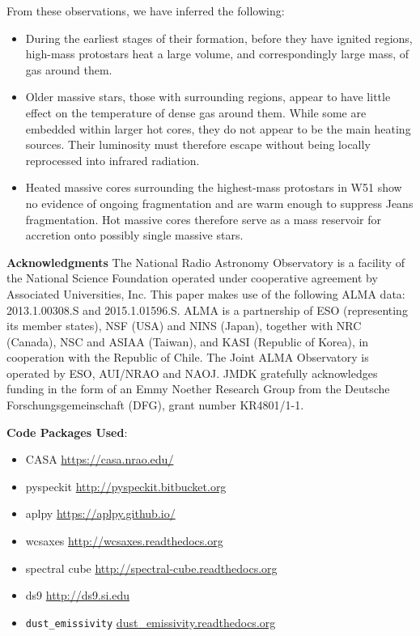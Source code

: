 \documentclass{emulateapj}
\begin{document}
From these observations, we have inferred the following: 
\begin{itemize}
    \item During the earliest stages of their formation, before they have 
        ignited \hii regions, high-mass protostars heat a large volume,
        and correspondingly large mass, of gas around them.
    \item Older massive stars, those with surrounding \hii regions, appear
        to have little effect on the temperature of dense gas around them.
        While some are embedded within larger hot cores, they do not appear to
        be the main heating sources.  Their luminosity must therefore escape
        without being locally reprocessed into infrared radiation.
    \item Heated massive cores surrounding the highest-mass protostars in
        W51 show no evidence of ongoing fragmentation and are warm enough
        to suppress Jeans fragmentation.  Hot massive cores therefore serve as
        a mass reservoir for accretion onto possibly single massive stars.
\end{itemize}



\textbf{Acknowledgments}
The National Radio Astronomy Observatory is a facility of the National Science
Foundation operated under cooperative agreement by Associated Universities,
Inc.
This paper makes use of the following ALMA data: 2013.1.00308.S 
and 2015.1.01596.S.
ALMA is a partnership of ESO (representing its member states), NSF (USA) and
NINS (Japan), together with NRC (Canada), NSC and ASIAA (Taiwan), and KASI
(Republic of Korea), in cooperation with the Republic of Chile. The Joint ALMA
Observatory is operated by ESO, AUI/NRAO and NAOJ.
JMDK gratefully acknowledges funding in the form of an
Emmy Noether Research Group from the Deutsche Forschungsgemeinschaft (DFG),
grant number KR4801/1-1.

\textbf{Code Packages Used}:

\begin{itemize}
    \item CASA \url{https://casa.nrao.edu/}
    \item pyspeckit \url{http://pyspeckit.bitbucket.org} \citet{Ginsburg2011c}
    \item aplpy \url{https://aplpy.github.io/}
    \item wcsaxes \url{http://wcsaxes.readthedocs.org}
    \item spectral cube \url{http://spectral-cube.readthedocs.org}
    \item ds9 \url{http://ds9.si.edu}
    \item \texttt{dust\_emissivity} \url{dust_emissivity.readthedocs.org}
\end{itemize}
\end{document}
